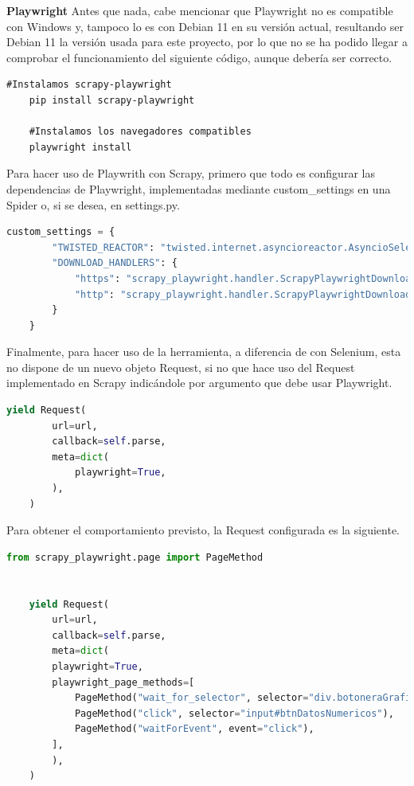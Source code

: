\textbf{Playwright}\newline
\newline
Antes que nada, cabe mencionar que Playwright no es compatible con Windows y, tampoco lo es con Debian 11 en su versión actual, resultando ser Debian 11 la versión usada para este proyecto, por lo que no se ha podido llegar a comprobar el funcionamiento del siguiente código, aunque debería ser correcto.

\begin{lstlisting}[caption={Instalación Playwright}]
	#Instalamos scrapy-playwright
	pip install scrapy-playwright
	
	#Instalamos los navegadores compatibles
	playwright install
\end{lstlisting}

Para hacer uso de Playwrith con Scrapy, primero que todo es configurar las dependencias de Playwright, implementadas mediante custom\_settings en una Spider o, si se desea, en settings.py.

\begin{lstlisting}[language=Python, caption={Configuración Playwright}]
	custom_settings = {
		"TWISTED_REACTOR": "twisted.internet.asyncioreactor.AsyncioSelectorReactor",
		"DOWNLOAD_HANDLERS": {
			"https": "scrapy_playwright.handler.ScrapyPlaywrightDownloadHandler",
			"http": "scrapy_playwright.handler.ScrapyPlaywrightDownloadHandler",
		}
	}
\end{lstlisting}

Finalmente, para hacer uso de la herramienta, a diferencia de con Selenium, esta no dispone de un nuevo objeto Request, si no que hace uso del Request implementado en Scrapy indicándole por argumento que debe usar Playwright.

\begin{lstlisting}[language=Python, caption={Playwright basic Request}]
	yield Request(
		url=url,
		callback=self.parse,
		meta=dict(
			playwright=True,
		),
	)
\end{lstlisting}

Para obtener el comportamiento previsto, la Request configurada es la siguiente.

\begin{lstlisting}[language=Python, caption={Agua en Navarra Playwright Request}]
	from scrapy_playwright.page import PageMethod
	
	
	yield Request(
		url=url,
		callback=self.parse,
		meta=dict(
		playwright=True,
		playwright_page_methods=[
			PageMethod("wait_for_selector", selector="div.botoneraGrafico", state="visible"),
			PageMethod("click", selector="input#btnDatosNumericos"),
			PageMethod("waitForEvent", event="click"),
		],
		),
	)
\end{lstlisting}

